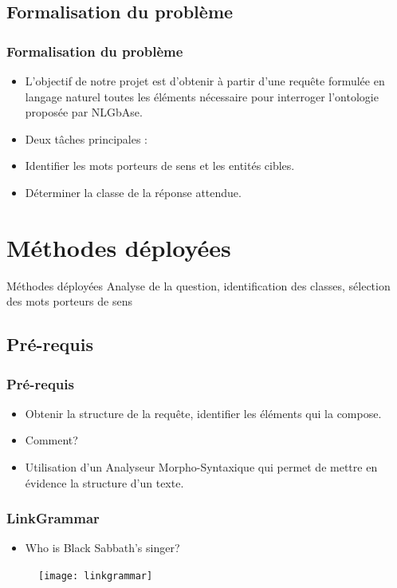 \documentclass[xcolor=dvipsnames]{beamer}
\begin{document}
\subsection{Formalisation du problème}
\frame 
{
    \frametitle{Formalisation du problème}
    \begin{itemize}
        \item<1-> L'objectif de notre projet est d'obtenir à partir d'une requête formulée en langage naturel toutes les éléments nécessaire pour interroger l'ontologie proposée par NLGbAse.
        \item<2-> Deux tâches principales :
        \item<3-> Identifier les mots porteurs de sens et les entités cibles.
        \item<4-> Déterminer la classe de la réponse attendue.
    \end{itemize}
}

\section{Méthodes déployées}
\begin{frame}
\begin{block}{\Large{Méthodes déployées}}
\tiny{Analyse de la question, identification des classes, sélection des mots porteurs de sens}
\end{block}
\end{frame}
\subsection{Pré-requis}
\frame
{
    \frametitle{Pré-requis}
    \begin{itemize}
        \item<1-> Obtenir la structure de la requête, identifier les éléments qui la compose.
        \item<2-> Comment?
        \item<3-> Utilisation d'un Analyseur Morpho-Syntaxique qui permet de mettre en évidence la structure d'un texte.
    \end{itemize}
}
\frame
{
    \frametitle{LinkGrammar}
    \begin{itemize}
        \item  Who is Black Sabbath's singer?
    \end{itemize}
    \begin{figure}
        \texttt{[image: linkgrammar]}
    \end{figure}
}
\end{document}
